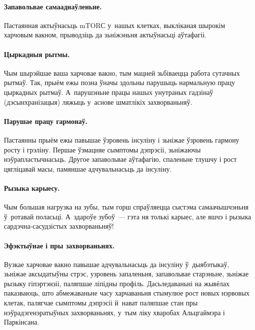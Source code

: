 \paragraph{Запавольвае самааднаўленьне.}\!
Пастаянная актыўнасьць mTORС у~нашых клетках, выкліканая шырокім харчовым вакном, прыводзіць да зьніжэньня актыўнасьці аўтафагіі.

\paragraph{Цыркадныя рытмы.}
Чым шырэйшае ваша харчовае вакно, тым мацней зьбіваецца работа сутачных рытмаў. Так, прыём ежы позна ўначы здольны парушыць нармальную працу цыркадных рытмаў. А~парушэньне працы нашых унутраных гадзінаў (дэсынхранізацыя) ляжыць у~аснове шматлікіх захворваньняў.

\paragraph{Парушае працу гармонаў.}
Пастаянны прыём ежы павышае ўзровень інсуліну і зьніжае ўзровень гармону росту і грэліну. Першае ўзмацняе сымптомы дэпрэсіі, зьніжаючы нэўрапластычнасьць. Другое запавольвае аўтафагію, спаленьне тлушчу і рост цягліцавай масы, памяншае адчувальнасьць да інсуліну.

\paragraph{Рызыка карыесу.}
Чым большая нагрузка на зубы, тым горш спраўляецца сыстэма самаачышчэньня ў~ротавай поласьці. А~здароўе зубоў~--- гэта ня толькі карыес, але яшчэ і рызыка сардэчна-сасудзістых захворваньняў!

\paragraph{Эфэктыўнае і пры захворваньнях.}
Вузкае харчовае вакно павышае адчувальнасьць да інсуліну ў~дыябэтыкаў, зьніжае аксыдатыўны стрэс, узровень запаленьня, запавольвае старэньне, зьніжае рызыку гіпэртэнзіі, паляпшае ліпідны профіль. Дасьледаваньні на жывёлах паказваюць, што абмежаваньне часу харчаваньня стымулюе рост новых нэрвовых клетак, палягчае сымптомы дэпрэсіі й~нават паляпшае стан пры нэўрадэгенэратыўных захворваньнях, у~тым ліку хваробах Альцгаймэра і Паркінсана.


